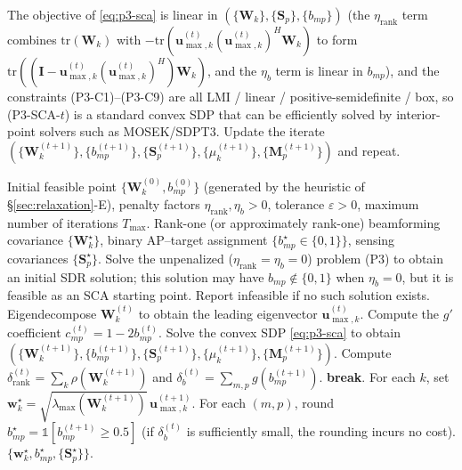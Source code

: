 \documentclass[12pt,a4paper]{article}
\newcommand{\vect}[1]{\mathbf{#1}}
\newcommand{\mat}[1]{\mathbf{#1}}
\newcommand{\tr}{\text{tr}}
\begin{document}
The objective of \eqref{eq:p3-sca} is linear in $(\{\mat{W}_k\}, \{\mat{S}_p\}, \{b_{mp}\})$ (the $\eta_{\text{rank}}$ term combines $\tr(\mat{W}_k)$ with $-\tr(\vect{u}_{\max,k}^{(t)}(\vect{u}_{\max,k}^{(t)})^H \mat{W}_k)$ to form $\tr((\mat{I} - \vect{u}_{\max,k}^{(t)}(\vect{u}_{\max,k}^{(t)})^H) \mat{W}_k)$, and the $\eta_b$ term is linear in $b_{mp}$), and the constraints (P3-C1)--(P3-C9) are all LMI / linear / positive-semidefinite / box, so (P3-SCA-$t$) is a standard convex SDP that can be efficiently solved by interior-point solvers such as MOSEK/SDPT3. Update the iterate $(\{\mat{W}_k^{(t+1)}\}, \{b_{mp}^{(t+1)}\}, \{\mat{S}_p^{(t+1)}\}, \{\mu_k^{(t+1)}\}, \{\mat{M}_p^{(t+1)}\})$ and repeat.

\begin{algorithm}[htbp]
\caption{Dual DC Penalty SCA Iteration (Joint Rank-One and Binary Recovery)}
\label{alg:sca-joint}
\begin{algorithmic}[1]
\Require Initial feasible point $\{\mat{W}_k^{(0)}, b_{mp}^{(0)}\}$ (generated by the heuristic of \S\ref{sec:relaxation}-E), penalty factors $\eta_{\text{rank}}, \eta_b > 0$, tolerance $\varepsilon > 0$, maximum number of iterations $T_{\max}$.
\Ensure Rank-one (or approximately rank-one) beamforming covariance $\{\mat{W}_k^\star\}$, binary AP--target assignment $\{b_{mp}^\star \in \{0,1\}\}$, sensing covariances $\{\mat{S}_p^\star\}$.
\State Solve the unpenalized ($\eta_{\text{rank}} = \eta_b = 0$) problem (P3) to obtain an initial SDR solution; this solution may have $b_{mp} \notin \{0,1\}$ when $\eta_b = 0$, but it is feasible as an SCA starting point. Report infeasible if no such solution exists.
        \State Eigendecompose $\mat{W}_k^{(t)}$ to obtain the leading eigenvector $\vect{u}_{\max,k}^{(t)}$.
    \EndFor
        \State Compute the $g'$ coefficient $c_{mp}^{(t)} = 1 - 2 b_{mp}^{(t)}$.
    \EndFor
    \State Solve the convex SDP \eqref{eq:p3-sca} to obtain $(\{\mat{W}_k^{(t+1)}\}, \{b_{mp}^{(t+1)}\}, \{\mat{S}_p^{(t+1)}\}, \{\mu_k^{(t+1)}\}, \{\mat{M}_p^{(t+1)}\})$.
    \State Compute $\delta_{\text{rank}}^{(t)} = \sum_k \rho(\mat{W}_k^{(t+1)})$ and $\delta_b^{(t)} = \sum_{m,p} g(b_{mp}^{(t+1)})$.
        \State \textbf{break}.
    \EndIf
\EndFor
\State For each $k$, set $\vect{w}_k^\star = \sqrt{\lambda_{\max}(\mat{W}_k^{(t+1)})} \, \vect{u}_{\max,k}^{(t+1)}$.
\State For each $(m, p)$, round $b_{mp}^\star = \mathbb{1}[b_{mp}^{(t+1)} \geq 0.5]$ (if $\delta_b^{(t)}$ is sufficiently small, the rounding incurs no cost).
\State \Return $\{\vect{w}_k^\star, b_{mp}^\star, \{\mat{S}_p^\star\}\}$.
\end{algorithmic}
\end{algorithm}
\end{document}
